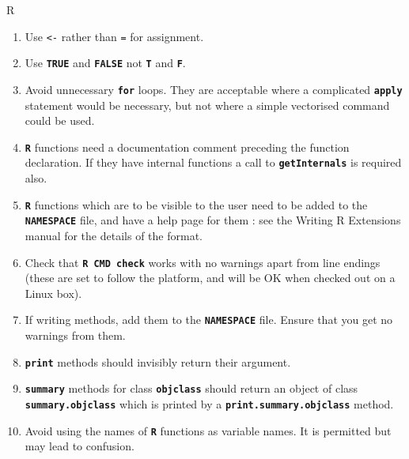 \documentclass[12pt, a4paper]{article}
\makeatletter
\renewcommand{\=}{\,=\,}
\newcommand{\+}{\,+\,}
\newcommand{\sfn}[1]{\textbf{\texttt{#1}}}
\renewcommand{\subsection}{\@startsection{subsection}{2}
                {0pt}{0.7\baselineskip}{0.3\baselineskip}
                {\sffamily} }
\makeatother
\begin{document}
\subsection{R}
\begin{enumerate}
\item Use \verb|<-| rather than \verb|=| for assignment.
\item Use \sfn{TRUE} and \sfn{FALSE} not \sfn{T} and \sfn{F}.
\item Avoid unnecessary \sfn{for} loops. They are acceptable where a complicated
  \sfn{apply} statement would be necessary,  but not where a simple vectorised
    command could be used.
  \item \sfn{R} functions need a documentation comment preceding the function
    declaration. If they have internal functions a call to \sfn{getInternals} is
    required also.
  \item \sfn{R} functions which are to be visible to the user need to be added
    to the \sfn{NAMESPACE} file, and have a help page for them : see the Writing
    R Extensions manual for the details of the format.
  \item Check that \sfn{R CMD check} works with no warnings apart from line
    endings (these are set to follow the platform, and will be OK when checked
    out on a Linux box).
  \item If writing methods, add them to the \sfn{NAMESPACE} file. Ensure that
    you get no warnings from them.
  \item \sfn{print} methods should invisibly return their argument.
  \item \sfn{summary} methods for class \sfn{objclass} should return an object
    of class \sfn{summary.objclass} which is printed by a
    \sfn{print.summary.objclass} method.
\item Avoid using the names of \sfn{R} functions as variable names. It is
  permitted but may lead to confusion.
\end{enumerate}
\end{document}
